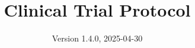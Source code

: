 \documentclass[
]{scrartcl}
\title{Clinical Trial Protocol}
\subtitle{ADVANCE TRAUMA\\
\strut \\
Effects of Advanced Trauma Life Support\textsuperscript{®} Training
Compared to Standard Care on Adult Trauma Patient Outcomes: A Cluster
Randomised Trial}
\author{Version 1.4.0, 2025-04-30}
\date{}
\begin{document}


\begin{titlepage}


\newcommand{\titlepagepagealign}{
\ifthenelse{\equal{center}{right}}{\raggedleft}{}
\ifthenelse{\equal{center}{center}}{\centering}{}
\ifthenelse{\equal{center}{left}}{\raggedright}{}
}


\newcommand{\titleandsubtitle}{
{\fontsize{15}{18.0}\selectfont
{\uppercase{\nohyphens{Clinical Trial Protocol}}}\par
}%

\vspace{\betweentitlesubtitle}
{
\fontsize{20}{24.0}\selectfont
{\bfseries{\nohyphens{ADVANCE TRAUMA\\
\strut \\
Effects of Advanced Trauma Life Support\textsuperscript{®} Training
Compared to Standard Care on Adult Trauma Patient Outcomes: A Cluster
Randomised Trial}}}\par
}}
\newcommand{\titlepagetitleblock}{
\rule{\textwidth}{0.4pt} %
\vspace{0.025\textheight} %

\titleandsubtitle

\vspace{0.025\textheight} 
\rule{0.3\textwidth}{0.4pt} %
}
\newcommand{\authorstyle}[1]{{\Large{#1}}}

\newcommand{\affiliationstyle}[1]{{\large{#1}}}

\newcommand{\titlepageauthorblock}{
{\authorstyle{\nohyphens{Version 1.4.0, 2025-04-30}\\}}
}

\newcommand{\titlepageaffiliationblock}{
\hangindent=1em
\hangafter=1
{\affiliationstyle{


\vspace{1\baselineskip} 
}}
}
\newcommand{\headerstyled}{%
{}
}
\newcommand{\footerstyled}{%
{\large{\textsc{}}}
}
\newcommand{\datestyled}{%
{}
}


\newcommand{\titlepageheaderblock}{\headerstyled}

\newcommand{\titlepagefooterblock}{
\footerstyled
}

\newcommand{\titlepagedateblock}{
\datestyled
}

\newcommand{\titleblock}{\newlength{\betweentitlesubtitle}
\setlength{\betweentitlesubtitle}{\baselineskip}
{

}}
\end{titlepage}
\end{document}
